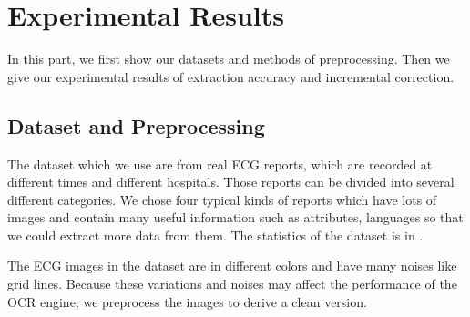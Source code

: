 \section{Experimental Results}
\label{sec:eval}
In this part, we first show our datasets and methods of preprocessing. Then we give our experimental results of extraction accuracy and incremental correction.

\subsection{Dataset and Preprocessing}
The dataset which we use are from real ECG reports, which are recorded at different times and different hospitals. Those reports can be divided into several different categories. We chose four typical kinds of reports which have lots of images and contain many useful information such as attributes, languages so that we could extract more data from them.
The statistics of the dataset is in . 




The ECG images in the dataset are in different colors 
and have many noises like grid lines. 
Because these variations and noises
may affect the performance of the OCR engine, 
we preprocess the images to derive a clean version. 

